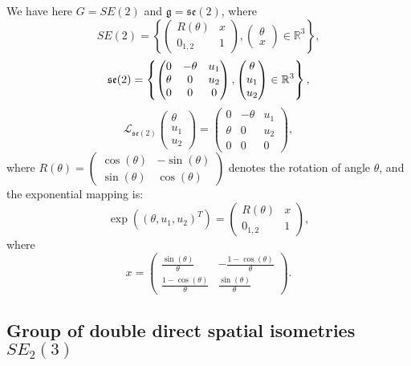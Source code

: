 \documentclass[a4paper,12pt,onecolumn]{article}
\newcommand{\RR}{{\mathbb{R}}}
\begin{document}
We have here $G=SE(2)$ and $\mathfrak{g} = \mathfrak{se}(2)$, where $$
SE(2)= \left\lbrace \begin{pmatrix} R(\theta) & x \\ 0_{1,2} & 1 \end{pmatrix}, \begin{pmatrix} \theta \\ x \end{pmatrix} \in \RR^3 \right\rbrace , $$ $$ { \frak{se}(2)= \left\lbrace \begin{pmatrix} 0 & -\theta & u_1 \\ \theta & 0 & u_2 \\ 0 & 0 & 0 \end{pmatrix}, \begin{pmatrix} \theta \\ u_1 \\ u_2 \end{pmatrix} \in \RR^3 \right\rbrace, }$$ $$ { \mathcal{L}_{\mathfrak{se}(2)} \begin{pmatrix} \theta \\ u_1 \\ u_2 \end{pmatrix} = \begin{pmatrix} 0 & -\theta & u_1 \\ \theta & 0 & u_2 \\ 0 & 0 & 0 \end{pmatrix},}
$$ where
$R(\theta)=\begin{pmatrix} \cos(\theta) &  -\sin(\theta) \\ \sin(\theta) & \cos(\theta) \end{pmatrix}$ denotes the rotation of angle $\theta$, and the exponential mapping is:
\[
\exp \left( (\theta , u_1 , u_2)^T \right) = \begin{pmatrix}R(\theta) & x \\ 0_{1,2} & 1 \end{pmatrix},
\]
where
\[
x=
\begin{pmatrix}
\frac{\sin(\theta)}{\theta}          &     -\frac{1-\cos(\theta)}{\theta} \\
\frac{1-\cos(\theta)}{\theta}      &   \frac{\sin(\theta)}{\theta}   
\end{pmatrix}.
\]

\subsection{Group of double direct spatial isometries $SE_2(3)$}
\label{sect::tuto_SE23}
\end{document}

